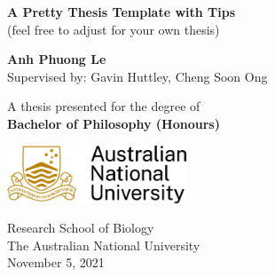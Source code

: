 \begin{titlepage}
    \begin{center}
        \vspace*{1cm}
        \Huge
        \textbf{A Pretty Thesis Template with Tips} \\
        (feel free to adjust for your own thesis) \\
        \LARGE
        \vspace{3cm}
            
        \textbf{Anh Phuong Le} \\
        \normalsize
        \vspace{1cm}
        Supervised by: Gavin Huttley, Cheng Soon Ong
            
        \vfill
        
        \large   
        A thesis presented for the degree of\\
        \textbf{Bachelor of Philosophy (Honours)}  \\
            
        \vspace{0.8cm}
            
        \includegraphics[width=0.4\textwidth]{graphics/ANU_Primary_Horizontal_GoldBlack.jpg} 
            
        \Large
        Research School of Biology\\
        The Australian National University\\
        November 5, 2021 \\
        
            
    \end{center}
\end{titlepage}